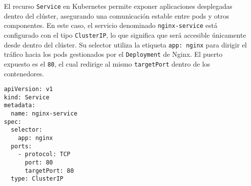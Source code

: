El recurso \texttt{Service} en Kubernetes permite exponer aplicaciones desplegadas dentro del clúster, asegurando una comunicación estable entre pods y otros componentes. En este caso, el servicio denominado \texttt{nginx-service} está configurado con el tipo \texttt{ClusterIP}, lo que significa que será accesible únicamente desde dentro del clúster. Su selector utiliza la etiqueta \texttt{app: nginx} para dirigir el tráfico hacia los pods gestionados por el \texttt{Deployment} de Nginx. El puerto expuesto es el \texttt{80}, el cual redirige al mismo \texttt{targetPort} dentro de los contenedores.

\begin{verbatim}
apiVersion: v1
kind: Service
metadata:
  name: nginx-service
spec:
  selector:
    app: nginx
  ports:
    - protocol: TCP
      port: 80
      targetPort: 80
  type: ClusterIP
\end{verbatim}